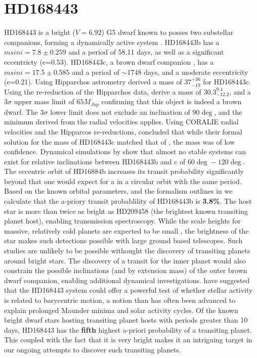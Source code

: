 \documentclass[12pt,preprint]{emulateapj}
\begin{document}

\section{HD168443}
\label{motivation}
HD168443 is a bright ($V=6.92$) G5 dwarf known to posses two substellar companions, forming a dynamically active system \citep{Veras07} . HD168443b \citep{Marcy99,Wright09} has a $msini=7.8\pm 0.259$ and a period of 58.11 days, as well as a significant eccentricty (e=0.53). HD168443c, a brown dwarf companion \citep{Udry02, Wright09}, has a  $msini=17.5\pm 0.585$ and a period of $\sim$1748 days, and a moderate eccentricity (e=0.21).  Using Hipparchos astrometry \citet{Reffert06} derived a mass of $37^{+36}_{-19}$ for HD168443c. Using the \citet{Leeuwen07} re-reduction of the Hipparchos data, \citet{Refferert11} derive a mass of $30.3^{9.4}_{-12.2}$, and a $3\sigma$ upper mass limit of $65M_{Jup}$ confirming that this object is indeed a brown dwarf.   The $3\sigma$  lower limit does not exclude an inclination of $90 \deg$, and the minimum derived from the radial velocities applies. Using CORALIE radial velocities and the \citet{Leeuwen07} Hipparcos re-reductions,  \citet{Sahlmann11} concluded that while their formal solution for the mass of HD168443c matched that of  \citet{Reffert11}, the mass was of low confidence. Dynamical simulations by \citet{Veras11} show that almost no stable systems can exist for relative inclinations between HD168443b and c of $60\deg-120\deg$.  The eccentric orbit of HD16884b increases its transit probability significantly beyond that one would expect for a in a circular orbit with the same period. Based on the known orbital parameters, and the formalism outlines in \citet{Kane09} we calculate that the a-priory transit probablility of HD168443b is {\bf3.8\%}. The host star is more than twice as bright as HD209458 (the brightest known transiting planet host), enabling transmission spectroscopy.  While the scale heights for massive, relatively cold planets are  expected to be small \citep{Madjar11}, the brightness of the star makes such detections possible with large ground based telescopes. Such studies are unlikely to be possible withought the discovery of transiting planets around bright stars. The discovery of a transit for the inner planet would also constrain the possible inclinations (and by extension mass) of the outer brown dwarf companion, enabling additional dynamical investigations.  \citet{Perryman11} have suggested that the HD168443 system could offer a powerful test of whether stellar activity is related to barycentric motion, a notion than has often been advanced to explain prolonged Maunder minima and solar activity cycles. Of the known bright dwarf stars hosting transiting planet hosts with periods greater than 10 days, HD168443 has the {\bf fifth} highest a-priori probability of a transiting planet. This coupled with the fact that it is very bright makes it an intriguing target in our ongoing attempts to discover such transiting planets.
\end{document}
